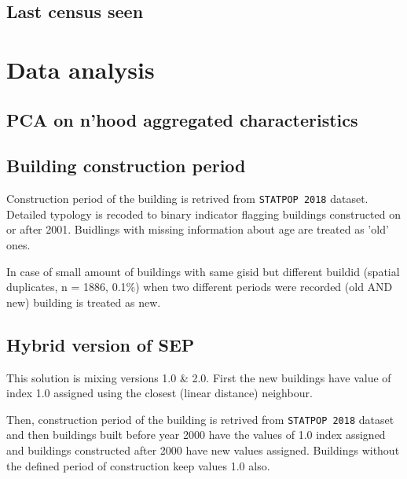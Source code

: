 \documentclass[a4paper, notitlepage, fleqn]{article} %
\begin{document}
\subsection{Last census seen}
\begin{stlog}\end{stlog}
\newpage
\section{Data analysis}
\subsection{PCA on n'hood aggregated characteristics}
\begin{stlog}\end{stlog}
\newpage
\subsection{Building construction period}

Construction period of the building is retrived from \texttt{STATPOP 2018} dataset. Detailed typology is recoded to binary indicator flagging buildings constructed on or after 2001. Buidlings with missing information about age are treated as 'old' ones. 

In case of small amount of buildings with same gisid but different buildid 
(spatial duplicates, n = 1886, 0.1\%) 
when two different periods were recorded (old AND new) building is treated as new. 
\begin{stlog}\end{stlog}
\newpage
\subsection{Hybrid version of SEP}

This solution is mixing versions 1.0 \& 2.0. First the new buildings have value of index 1.0 assigned using the closest (linear distance) neighbour. 

Then, construction period of the building is retrived from \texttt{STATPOP 2018} dataset and then buildings built before year 2000 have the values of 1.0 index assigned and buildings constructed after 2000 have new values assigned. Buildings without the defined period of construction keep values 1.0 also. 
\end{document}
